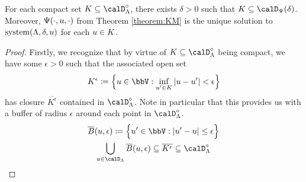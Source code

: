 \begin{proposition}
  \label{proposition:compact-ode-existence}
  For each compact set $K \subseteq \odeSpace^\circ$, there exists $\delta > 0$ such that $K \subseteq \momentSpace(\delta)$.
  Moreover, $\Psi(\cdot,u,\cdot)$ from Theorem \ref{theorem:KM} is the unique solution to $\operatorname{system}(\Lambda,\delta,u)$ for each $u \in K$.
\end{proposition}
\begin{proof}
  \label{proof:proposition:compact-ode-existence}
  Firstly, we recognize that by virtue of $K \subseteq \odeSpace^\circ$ being compact, we have some $\epsilon > 0$ such that the associated open set
  \begin{equation*}
    K^\epsilon \defeq \Big\{ \momentVar \in \vecSpace : \inf_{\momentVar' \in K} |\momentVar - \momentVar'| < \epsilon \Big\}
  \end{equation*}
  has closure $\overline{K^\epsilon}$ contained in $\odeSpace^\circ$.
  Note in particular that this provides us with a buffer of radius $\epsilon$ around each point in $\odeSpace^\circ$.
  \begin{gather*}
    \overline B(\momentVar, \epsilon) \defeq \Big\{ \momentVar' \in \vecSpace : |\momentVar' - \momentVar| \leq \epsilon \Big\} \\
    \bigcup_{\momentVar \in \odeSpace} \overline B(\momentVar, \epsilon) \subseteq \overline{K^\epsilon} \subseteq \odeSpace^\circ
  \end{gather*}


\end{proof}
